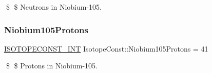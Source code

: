 \$ \$ Neutrons in Niobium-\/105. \mbox{\label{group___isotope_const-_niobium-_nb105_ga54a39dbb0777fe2a80de8095c16c50e9}} 
\subsubsection{\texorpdfstring{Niobium105\+Protons}{Niobium105Protons}}
{\footnotesize\ttfamily \mbox{\hyperlink{group___isotope_const-_macros_ga5f18360b3e99483a35c32d789e62621c}{I\+S\+O\+T\+O\+P\+E\+C\+O\+N\+S\+T\+\_\+\+I\+NT}} Isotope\+Const\+::\+Niobium105\+Protons = 41}

\$ \$ Protons in Niobium-\/105. 